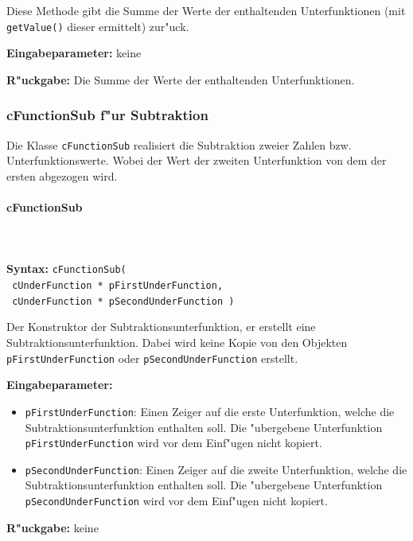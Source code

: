 \bigskip\noindent
Diese Methode gibt die Summe der Werte der enthaltenden Unterfunktionen (mit \verb|getValue()| dieser ermittelt) zur"uck.

\bigskip\noindent
\textbf{Eingabeparameter:} keine

\bigskip\noindent
\textbf{R"uckgabe:} Die Summe der Werte der enthaltenden Unterfunktionen.


\subsubsection{cFunctionSub f"ur Subtraktion}

Die Klasse \verb|cFunctionSub| realisiert die Subtraktion zweier Zahlen bzw. Unterfunktionswerte. Wobei der Wert der zweiten Unterfunktion von dem der ersten abgezogen wird.

\paragraph{cFunctionSub}

\ \\\\\noindent
\textbf{Syntax:} \verb|cFunctionSub(| \\\verb| cUnderFunction * pFirstUnderFunction,| \\\verb| cUnderFunction * pSecondUnderFunction )|

\bigskip\noindent
Der Konstruktor der Subtraktionsunterfunktion, er erstellt eine Subtraktionsunterfunktion. Dabei wird keine Kopie von den Objekten \verb|pFirstUnderFunction| oder \verb|pSecondUnderFunction| erstellt.

\bigskip\noindent
\textbf{Eingabeparameter:}
\begin{itemize}
 \item \verb|pFirstUnderFunction|: Einen Zeiger auf die erste Unterfunktion, welche die Subtraktionsunterfunktion enthalten soll. Die "ubergebene Unterfunktion \verb|pFirstUnderFunction| wird vor dem Einf"ugen nicht kopiert.
 \item \verb|pSecondUnderFunction|: Einen Zeiger auf die zweite Unterfunktion, welche die Subtraktionsunterfunktion enthalten soll. Die "ubergebene Unterfunktion \verb|pSecondUnderFunction| wird vor dem Einf"ugen nicht kopiert.
\end{itemize}

\bigskip\noindent
\textbf{R"uckgabe:} keine


